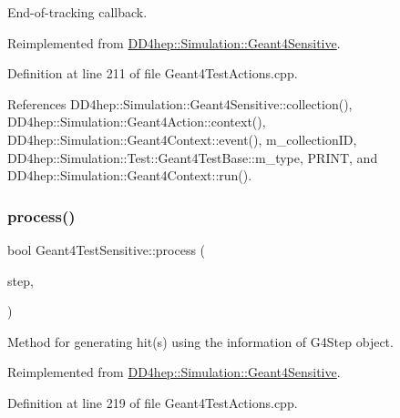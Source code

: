 End-\/of-\/tracking callback. 



Reimplemented from \hyperlink{class_d_d4hep_1_1_simulation_1_1_geant4_sensitive_abcce05101539a9941c06aada4625a608}{D\+D4hep\+::\+Simulation\+::\+Geant4\+Sensitive}.



Definition at line 211 of file Geant4\+Test\+Actions.\+cpp.



References D\+D4hep\+::\+Simulation\+::\+Geant4\+Sensitive\+::collection(), D\+D4hep\+::\+Simulation\+::\+Geant4\+Action\+::context(), D\+D4hep\+::\+Simulation\+::\+Geant4\+Context\+::event(), m\+\_\+collection\+ID, D\+D4hep\+::\+Simulation\+::\+Test\+::\+Geant4\+Test\+Base\+::m\+\_\+type, P\+R\+I\+NT, and D\+D4hep\+::\+Simulation\+::\+Geant4\+Context\+::run().

\hypertarget{class_d_d4hep_1_1_simulation_1_1_test_1_1_geant4_test_sensitive_aa5d824cbc3f5bfdd8e03236c8aec07ed}{}\label{class_d_d4hep_1_1_simulation_1_1_test_1_1_geant4_test_sensitive_aa5d824cbc3f5bfdd8e03236c8aec07ed} 
\subsubsection{\texorpdfstring{process()}{process()}}
{\footnotesize\ttfamily bool Geant4\+Test\+Sensitive\+::process (\begin{DoxyParamCaption}\item[{G4\+Step $\ast$}]{step,  }\item[{G4\+Touchable\+History $\ast$}]{ }\end{DoxyParamCaption})\hspace{0.3cm}{\ttfamily [virtual]}}



Method for generating hit(s) using the information of G4\+Step object. 



Reimplemented from \hyperlink{class_d_d4hep_1_1_simulation_1_1_geant4_sensitive_a9a9463a6c29a66dad43a52ffc9f7838d}{D\+D4hep\+::\+Simulation\+::\+Geant4\+Sensitive}.



Definition at line 219 of file Geant4\+Test\+Actions.\+cpp.



